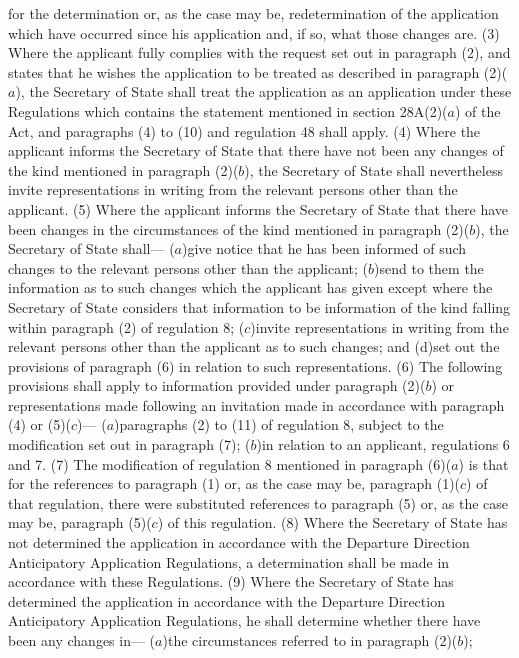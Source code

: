 \documentclass[a4paper]{article}
\begin{document}
for the determination or, as the case may be, redetermination of the application
which have occurred since his application and, if so, what those changes are.
(3) Where the applicant fully complies with the request set out in paragraph
(2), and states that he wishes the application to be treated as described in
paragraph (2)($a$), the Secretary of State shall treat the application as an
application under these Regulations which contains the statement mentioned in
section 28A(2)($a$) of the Act, and paragraphs (4) to (10) and regulation 48 shall
apply.
(4) Where the applicant informs the Secretary of State that there have not been
any changes of the kind mentioned in paragraph (2)($b$), the Secretary of State
shall nevertheless invite representations in writing from the relevant persons
other than the applicant.
(5) Where the applicant informs the Secretary of State that there have been
changes in the circumstances of the kind mentioned in paragraph (2)($b$), the
Secretary of State shall—
($a$)give notice that he has been informed of such changes to the relevant persons
other than the applicant;
($b$)send to them the information as to such changes which the applicant has given
except where the Secretary of State considers that information to be information
of the kind falling within paragraph (2) of regulation 8;
($c$)invite representations in writing from the relevant persons other than the
applicant as to such changes; and
(d)set out the provisions of paragraph (6) in relation to such representations.
(6) The following provisions shall apply to information provided under paragraph
(2)($b$) or representations made following an invitation made in accordance with
paragraph (4) or (5)($c$)—
($a$)paragraphs (2) to (11) of regulation 8, subject to the modification set out
in paragraph (7);
($b$)in relation to an applicant, regulations 6 and 7.
(7) The modification of regulation 8 mentioned in paragraph (6)($a$) is that for
the references to paragraph (1) or, as the case may be, paragraph (1)($c$) of that
regulation, there were substituted references to paragraph (5) or, as the case
may be, paragraph (5)($c$) of this regulation.
(8) Where the Secretary of State has not determined the application in
accordance with the Departure Direction Anticipatory Application Regulations, a
determination shall be made in accordance with these Regulations.
(9) Where the Secretary of State has determined the application in accordance
with the Departure Direction Anticipatory Application Regulations, he shall
determine whether there have been any changes in—
($a$)the circumstances referred to in paragraph (2)($b$);
\end{document}
